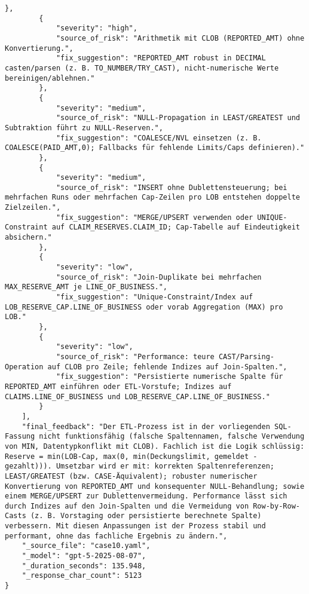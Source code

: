 \begin{lstlisting}[caption={Ausgabe: GPT-5 Anwendungsfall 10 Robustheitsdurchlauf},label={gpt_case10_prompt3}]
        },
        {
            "severity": "high",
            "source_of_risk": "Arithmetik mit CLOB (REPORTED_AMT) ohne Konvertierung.",
            "fix_suggestion": "REPORTED_AMT robust in DECIMAL casten/parsen (z. B. TO_NUMBER/TRY_CAST), nicht-numerische Werte bereinigen/ablehnen."
        },
        {
            "severity": "medium",
            "source_of_risk": "NULL-Propagation in LEAST/GREATEST und Subtraktion führt zu NULL-Reserven.",
            "fix_suggestion": "COALESCE/NVL einsetzen (z. B. COALESCE(PAID_AMT,0); Fallbacks für fehlende Limits/Caps definieren)."
        },
        {
            "severity": "medium",
            "source_of_risk": "INSERT ohne Dublettensteuerung; bei mehrfachen Runs oder mehrfachen Cap-Zeilen pro LOB entstehen doppelte Zielzeilen.",
            "fix_suggestion": "MERGE/UPSERT verwenden oder UNIQUE-Constraint auf CLAIM_RESERVES.CLAIM_ID; Cap-Tabelle auf Eindeutigkeit absichern."
        },
        {
            "severity": "low",
            "source_of_risk": "Join-Duplikate bei mehrfachen MAX_RESERVE_AMT je LINE_OF_BUSINESS.",
            "fix_suggestion": "Unique-Constraint/Index auf LOB_RESERVE_CAP.LINE_OF_BUSINESS oder vorab Aggregation (MAX) pro LOB."
        },
        {
            "severity": "low",
            "source_of_risk": "Performance: teure CAST/Parsing-Operation auf CLOB pro Zeile; fehlende Indizes auf Join-Spalten.",
            "fix_suggestion": "Persistierte numerische Spalte für REPORTED_AMT einführen oder ETL-Vorstufe; Indizes auf CLAIMS.LINE_OF_BUSINESS und LOB_RESERVE_CAP.LINE_OF_BUSINESS."
        }
    ],
    "final_feedback": "Der ETL-Prozess ist in der vorliegenden SQL-Fassung nicht funktionsfähig (falsche Spaltennamen, falsche Verwendung von MIN, Datentypkonflikt mit CLOB). Fachlich ist die Logik schlüssig: Reserve = min(LOB-Cap, max(0, min(Deckungslimit, gemeldet - gezahlt))). Umsetzbar wird er mit: korrekten Spaltenreferenzen; LEAST/GREATEST (bzw. CASE-Äquivalent); robuster numerischer Konvertierung von REPORTED_AMT und konsequenter NULL-Behandlung; sowie einem MERGE/UPSERT zur Dublettenvermeidung. Performance lässt sich durch Indizes auf den Join-Spalten und die Vermeidung von Row-by-Row-Casts (z. B. Vorstaging oder persistierte berechnete Spalte) verbessern. Mit diesen Anpassungen ist der Prozess stabil und performant, ohne das fachliche Ergebnis zu ändern.",
    "_source_file": "case10.yaml",
    "_model": "gpt-5-2025-08-07",
    "_duration_seconds": 135.948,
    "_response_char_count": 5123
}
\end{lstlisting}

